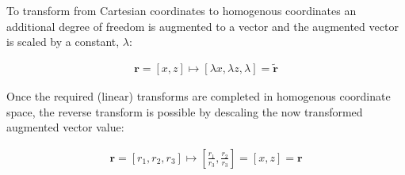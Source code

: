 %
To transform from Cartesian coordinates to \gls{homogenous coordinates} an additional degree of freedom is augmented to a vector and the augmented vector is scaled by a constant, $\lambda$:

\begin{align}
\textbf{r} = [x,z] \mapsto  [\lambda x, \lambda z, \lambda] = \widetilde{\textbf{r}} \label{eq:cart2homo}
\end{align}

Once the required (linear) transforms are completed in \gls{homogenous coordinate} space, the reverse transform is possible by descaling the now transformed augmented vector value:

\begin{align}
{\textbf{r}} =[r_1,r_2,r_3] \mapsto \left[\frac{r_1}{r_3},\frac{r_2}{r_3}\right] = [x,z] = \textbf{r} \label{eq:homo2cart} %
\end{align}


